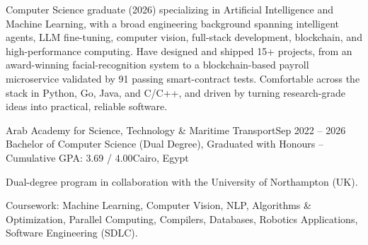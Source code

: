 \documentclass[a4paper,10pt]{article}
\begin{document}

\begin{cvcontacts}
\cvsep
{}\cvsep
{}\cvsep
{}\cvsep
{}
\end{cvcontacts}


Computer Science graduate (2026) specializing in Artificial Intelligence and
Machine Learning, with a broad engineering background spanning intelligent
agents, LLM fine-tuning, computer vision, full-stack development, blockchain,
and high-performance computing. Have designed and shipped 15+ projects, from an
award-winning facial-recognition system to a blockchain-based payroll
microservice validated by 91 passing smart-contract tests. Comfortable across
the stack in Python, Go, Java, and C/C++, and driven by turning research-grade
ideas into practical, reliable software.


\cventry
  {Arab Academy for Science, Technology \& Maritime Transport}{Sep 2022 -- 2026}
  {Bachelor of Computer Science (Dual Degree), Graduated with Honours -- Cumulative GPA: 3.69 / 4.00}{Cairo, Egypt}
\begin{cvitems}
  \item Dual-degree program in collaboration with the University of Northampton (UK).
  \item Coursework: Machine Learning, Computer Vision, NLP, Algorithms \&
        Optimization, Parallel Computing, Compilers, Databases, Robotics
        Applications, Software Engineering (SDLC).
\end{cvitems}

\end{document}
